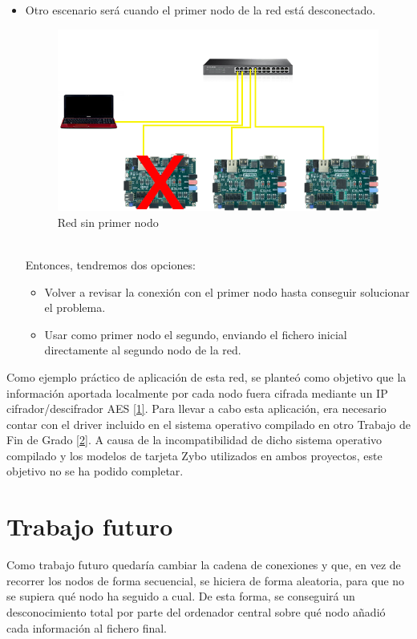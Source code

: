 \begin{itemize}
\begin{figure}[h]
	\end{figure}
	\item Otro escenario será cuando el primer nodo de la red está desconectado.
	\begin{figure}[h]
		\centering
		\includegraphics[scale=0.5]{Epilogo/RedSinNodo1.png}
		\caption{Red sin primer nodo}
		\label{Red sin primer nodo}
	\end{figure}\\
	Entonces, tendremos dos opciones:
	\begin{itemize}
		\item Volver a revisar la conexión con el primer nodo hasta conseguir solucionar el problema.
		\item Usar como primer nodo el segundo, enviando el fichero inicial directamente al segundo nodo de la red.
	\end{itemize}
\end{itemize}

Como ejemplo práctico de aplicación de esta red, se planteó como objetivo que la información aportada localmente por cada nodo fuera cifrada mediante un IP cifrador/descifrador AES \hyperlink{1}{[1]}. Para llevar a cabo esta aplicación, era necesario contar con el driver incluido en el sistema operativo compilado en otro Trabajo de Fin de Grado \hyperlink{2}{[2]}. A causa de la incompatibilidad de dicho sistema operativo compilado y los modelos de tarjeta Zybo utilizados en ambos proyectos, este objetivo no se ha podido completar.

\section{Trabajo futuro}
Como trabajo futuro quedaría cambiar la cadena de conexiones y que, en vez de recorrer los nodos de forma secuencial, se hiciera de forma aleatoria, para que no se supiera qué nodo ha seguido a cual. De esta forma, se conseguirá un desconocimiento total por parte del ordenador central sobre qué nodo añadió cada información al fichero final.

